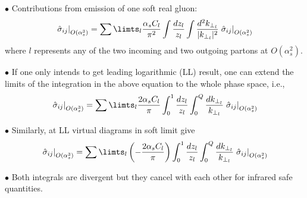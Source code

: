 \documentclass[9pt,a4paper,unknownkeysallowed,xcolor=dvipsnames,aspectratio=43]{beamer}
\begin{document}
%
%
\begin{frame}
\vspace{2mm}

{\color{darkred}\Large$\bullet$} {\color{darkred}Contributions from emission of one soft real gluon:}
\begin{align}
    \left.\hat{\sigma}_{ij}\right|_{O(\alpha_s^3)} = \sum\limts_l \frac{\alpha_s C_l}{\pi^2}\int\frac{dz_l}{z_l}\int\frac{d^2 k_{\perp_ l}}{|k_{\perp_l}|^2}\left.\hat{\sigma}_{ij}\right|_{O(\alpha_s^2)}
\end{align}
where $l$ represents any of the two incoming and two outgoing partons at $O(\alpha_s^2)$.
\vspace{2mm}

{\color{darkred}\Large$\bullet$} If one only intends to get {\color{darkred}leading logarithmic (LL)} result, one can extend the limits of the integration in the above equation to the whole phase space, i.e.,
\begin{align}
    \left.\hat{\sigma}_{ij}\right|_{O(\alpha_s^3)} = \sum\limts_l \frac{2\alpha_s C_l}{\pi}\int_0^1\frac{dz_l}{z_l}\int_0^{Q}\frac{d k_{\perp_ l}}{k_{\perp_l}}\left.\hat{\sigma}_{ij}\right|_{O(\alpha_s^2)}
\end{align}

{\color{darkred}\Large$\bullet$} Similarly, at LL {\color{darkred}virtual diagrams in soft limit} give
\begin{align}
    \left.\hat{\sigma}_{ij}\right|_{O(\alpha_s^3)} = \sum\limts_l \left(-\frac{2\alpha_s C_l}{\pi}\right)\int_0^1\frac{dz_l}{z_l}\int_0^{Q}\frac{d k_{\perp_ l}}{k_{\perp_l}}\left.\hat{\sigma}_{ij}\right|_{O(\alpha_s^2)}
\end{align}

{\color{darkred}\Large$\bullet$} Both integrals are divergent but they cancel with each other for infrared safe quantities.

\end{frame}
%
%
\end{document}
